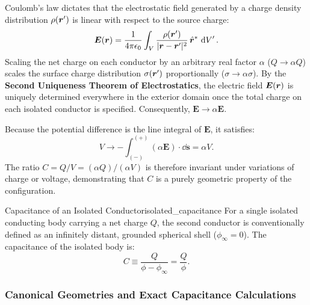 \begin{proofbox}
Coulomb's law dictates that the electrostatic field generated by a charge density distribution \(\rho(\bm{r}')\) is linear with respect to the source charge:
\begin{equation}
    \bm{E}(\bm{r}) = \frac{1}{4\pi\epsilon_0} \int_V \frac{\rho(\bm{r}')}{|\bm{r} - \bm{r}'|^2}\,\hat{\bm{r}}^*\,\dd{V'}.
\end{equation}
Scaling the net charge on each conductor by an arbitrary real factor \(\alpha\) (\(Q \to \alpha Q\)) scales the surface charge distribution \(\sigma(\bm{r}')\) proportionally (\(\sigma \to \alpha \sigma\)). By the \textbf{Second Uniqueness Theorem of Electrostatics}, the electric field \(\bm{E}(\bm{r})\) is uniquely determined everywhere in the exterior domain once the total charge on each isolated conductor is specified. Consequently, \(\bm{E} \to \alpha \bm{E}\). 

Because the potential difference is the line integral of \(\bm{E}\), it satisfies:
\begin{equation}
    V \to -\int_{(-)}^{(+)} (\alpha \bm{E}) \cdot \dd{\bm{s}} = \alpha V.
\end{equation}
The ratio \(C = Q/V = (\alpha Q)/(\alpha V)\) is therefore invariant under variations of charge or voltage, demonstrating that \(C\) is a purely geometric property of the configuration.
\end{proofbox}

\begin{definition}{Capacitance of an Isolated Conductor}{isolated_capacitance}
For a single isolated conducting body carrying a net charge \(Q\), the second conductor is conventionally defined as an infinitely distant, grounded spherical shell (\(\phi_\infty = 0\)). The capacitance of the isolated body is:
\begin{equation}
    C \equiv \frac{Q}{\phi - \phi_\infty} = \frac{Q}{\phi}.
\end{equation}
\end{definition}

\subsubsection{Canonical Geometries and Exact Capacitance Calculations}

